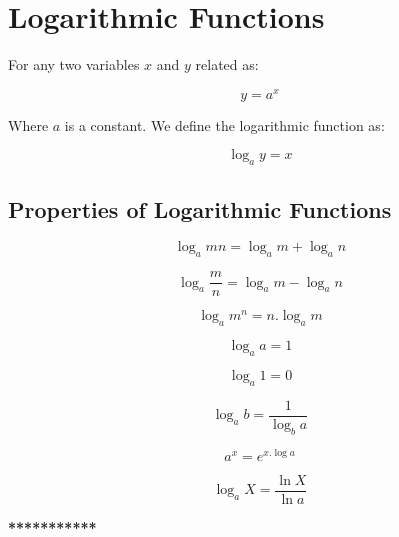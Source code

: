 \section{Logarithmic Functions}

For any two variables \(x\) and \(y\) related as:

\begin{equation}
\label{eq}
y = a^x
\end{equation}

Where \( a \) is a constant. We define the logarithmic function as:

\begin{equation}
\label{log}
\log_a{y} = x
\end{equation}

\subsection{\textbf{Properties of Logarithmic Functions}}

\begin{equation}
\label{logmn}
\log_a{mn} = \log_a{m} + \log_a{n}
\end{equation}

\begin{equation}
\label{logm/n}
\log_a {\frac{m}{n}} = \log_a{m} - \log_a{n}
\end{equation}

\begin{equation}
\label{logmton}
\log_a{m^n} = n . \log_a{m}
\end{equation}

\begin{equation}
\label{logatoa}
\log_a{a} = 1
\end{equation}

\begin{equation}
\label{log1}
\log_a{1} = 0
\end{equation}

\begin{equation}
\label{logatob}
\log_a{b} = \frac{1}{\log_b{a}}
\end{equation}

\begin{equation}
\label{exloga}
a^x = e^{x . \log{a}}
\end{equation}

\begin{equation}
\label{logXa}
\log_a{X} = \frac{\ln{X}}{\ln{a}}
\end{equation}

\vspace{1mm}
\begin{center}
\textbf{***********}
\end{center}
